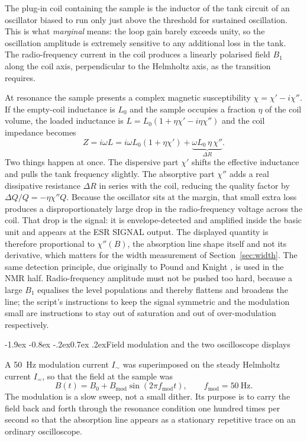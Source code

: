 \documentclass[11pt,a4paper]{article}
\makeatletter
\renewcommand\subsection{\@startsection{subsection}{2}{\z@}%
  {-1.9ex \@plus -0.8ex \@minus -.2ex}{0.7ex \@plus .2ex}{\normalfont\normalsize\bfseries}}
\makeatother
\begin{document}
The plug-in coil containing the sample is the inductor of the tank circuit of an oscillator biased
to run only just above the threshold for sustained oscillation. This is what \emph{marginal}
means: the loop gain barely exceeds unity, so the oscillation amplitude is extremely sensitive to
any additional loss in the tank. The radio-frequency current in the coil produces a linearly
polarised field $B_1$ along the coil axis, perpendicular to the Helmholtz axis, as the transition
requires.

At resonance the sample presents a complex magnetic susceptibility $\chi = \chi' - i\chi''$. If
the empty-coil inductance is $L_0$ and the sample occupies a fraction $\eta$ of the coil volume,
the loaded inductance is $L = L_0(1 + \eta\chi' - i\eta\chi'')$ and the coil impedance becomes
\begin{equation}
Z = i\omega L = i\omega L_0(1 + \eta\chi') + \underbrace{\omega L_0\,\eta\,\chi''}_{\Delta R} .
\end{equation}
Two things happen at once. The dispersive part $\chi'$ shifts the effective inductance and pulls
the tank frequency slightly. The absorptive part $\chi''$ adds a real dissipative resistance
$\Delta R$ in series with the coil, reducing the quality factor by $\Delta Q/Q = -\eta\chi''Q$.
Because the oscillator sits at the margin, that small extra loss produces a disproportionately
large drop in the radio-frequency voltage across the coil. That drop is the signal: it is
envelope-detected and amplified inside the basic unit and appears at the ESR SIGNAL output. The
displayed quantity is therefore proportional to $\chi''(B)$, the absorption line shape itself and
not its derivative, which matters for the width measurement of Section~\ref{sec:width}. The same
detection principle, due originally to Pound and Knight \cite{pound}, is used in the NMR half.
Radio-frequency amplitude must not be pushed too hard, because a large $B_1$ equalises the level
populations and thereby flattens and broadens the line; the script's instructions to keep the
signal symmetric and the modulation small are instructions to stay out of saturation and out of
over-modulation respectively.

\subsection{Field modulation and the two oscilloscope displays}

A \SI{50}{\hertz} modulation current $I_\sim$ was superimposed on the steady Helmholtz current
$I_=$, so that the field at the sample was
\begin{equation}
B(t) = B_0 + B_{\mathrm{mod}}\sin\left(2\pi f_{\mathrm{mod}} t\right), \qquad f_{\mathrm{mod}} = \SI{50}{\hertz} .
\end{equation}
The modulation is a slow sweep, not a small dither. Its purpose is to carry the field back and
forth through the resonance condition one hundred times per second so that the absorption line
appears as a stationary repetitive trace on an ordinary oscilloscope.
\end{document}
